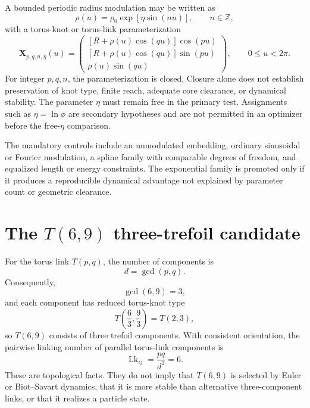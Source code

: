 \documentclass[11pt]{article}
\newcommand{\Z}{\mathbb Z}
\begin{document}
A bounded periodic radius modulation may be written as
\begin{equation}
    \rho(u)
    =
    \rho_0\exp\!\left[\eta\sin(nu)\right],
    \qquad
    n\in\Z,
    \label{eq:spec_periodic_exponential_radius}
\end{equation}
with a torus-knot or torus-link parameterization
\begin{equation}
    \mathbf X_{p,q,n,\eta}(u)
    =
    \begin{pmatrix}
    [R+\rho(u)\cos(qu)]\cos(pu)\\
    [R+\rho(u)\cos(qu)]\sin(pu)\\
    \rho(u)\sin(qu)
    \end{pmatrix},
    \qquad 0\le u<2\pi.
    \label{eq:spec_periodically_modulated_torus_embedding}
\end{equation}
For integer $p,q,n$, the parameterization is closed.  Closure alone does not
establish preservation of knot type, finite reach, adequate core clearance,
or dynamical stability.  The parameter $\eta$ must remain free in the primary
test.  Assignments such as $\eta=\ln\phi$ are secondary hypotheses and are not
permitted in an optimizer before the free-$\eta$ comparison.

The mandatory controls include an unmodulated embedding, ordinary sinusoidal
or Fourier modulation, a spline family with comparable degrees of freedom,
and equalized length or energy constraints.  The exponential family is
promoted only if it produces a reproducible dynamical advantage not explained
by parameter count or geometric clearance.

\section{The $T(6,9)$ three-trefoil candidate}

For the torus link $T(p,q)$, the number of components is
\begin{equation}
    d=\gcd(p,q).
\end{equation}
Consequently,
\begin{equation}
    \gcd(6,9)=3,
\end{equation}
and each component has reduced torus-knot type
\begin{equation}
    T\!\left(\frac{6}{3},\frac{9}{3}\right)
    =T(2,3),
\end{equation}
so $T(6,9)$ consists of three trefoil components.  With consistent orientation,
the pairwise linking number of parallel torus-link components is
\begin{equation}
    \operatorname{Lk}_{ij}
    =
    \frac{pq}{d^2}
    =6.
\end{equation}
These are topological facts.  They do not imply that $T(6,9)$ is selected by
Euler or Biot--Savart dynamics, that it is more stable than alternative
three-component links, or that it realizes a particle state.
\end{document}
